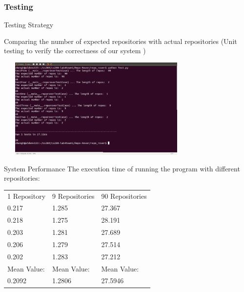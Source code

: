 \begin{frame}
	\centering
	\frametitle{Testing}

	\begin{block}{Testing Strategy}
		
	 Comparing the number of expected repositories with actual repositories (Unit testing to verify the correctness of our system )
			\begin{center}
			\includegraphics[width=10cm, height=5cm]{images/TestingResult.png}
			\end{center}
		
	\end{block}
	
\end{frame}

\begin{frame}
	\begin{block}{System Performance}
	The execution time of running the program with different repositories: 
		\begin{center}
			\begin{table}[]
			\centering
			\begin{tabular}{lll}
			\hline
 			1 Repository& 9 Repositories & 90 Repositories \\
 			0.217&1.285  &27.367    \\
 			\hline
 			0.218&1.275  &28.191    \\
 			\hline
 			0.203&1.281  &27.689		\\
 			\hline   
 			0.206& 1.279 & 27.514	\\
 			\hline
 			0.202& 1.283	 & 27.212	\\
 			\hline
 			Mean Value: & Mean Value: & Mean Value: \\
 			0.2092 & 1.2806	& 27.5946 
			\end{tabular}
			\end{table}
		\end{center}		
	\end{block}	
\end{frame}

